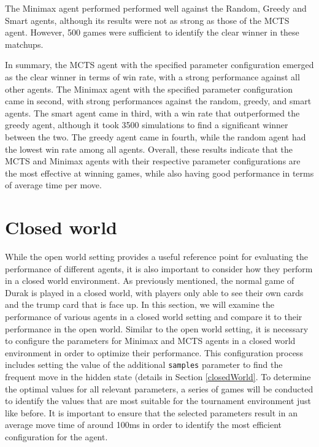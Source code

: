 The Minimax agent performed performed well against the Random, Greedy and Smart agents, although its results were not as strong as those of the MCTS agent. However, 500 games were sufficient to identify the clear winner in these matchups. 

In summary, the MCTS agent with the specified parameter configuration emerged as the clear winner in terms of win rate, with a strong performance against all other agents. The Minimax agent with the specified parameter configuration came in second, with strong performances against the random, greedy, and smart agents. The smart agent came in third, with a win rate that outperformed the greedy agent, although it took 3500 simulations to find a significant winner between the two. The greedy agent came in fourth, while the random agent had the lowest win rate among all agents. Overall, these results indicate that the MCTS and Minimax agents with their respective parameter configurations are the most effective at winning games, while also having good performance in terms of average time per move.

\section{Closed world}

While the open world setting provides a useful reference point for evaluating the performance of different agents, it is also important to consider how they perform in a closed world environment. As previously mentioned, the normal game of Durak is played in a closed world, with players only able to see their own cards and the trump card that is face up. In this section, we will examine the performance of various agents in a closed world setting and compare it to their performance in the open world. Similar to the open world setting, it is necessary to configure the parameters for Minimax and MCTS agents in a closed world environment in order to optimize their performance. This configuration process includes setting the value of the additional \texttt{samples} parameter to find the frequent move in the hidden state (details in Section \ref{closedWorld}. To determine the optimal values for all relevant parameters, a series of games will be conducted to identify the values that are most suitable for the tournament environment just like before. It is important to ensure that the selected parameters result in an average move time of around 100ms in order to identify the most efficient configuration for the agent.

